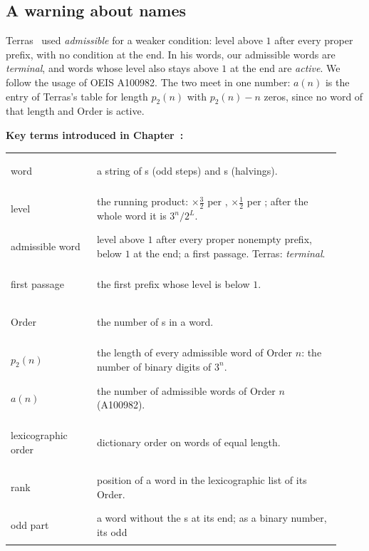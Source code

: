 \documentclass[11pt,a4paper,titlepage]{article}
\makeatletter
\newcommand{\boxhere}[1]{\leavevmode
  \Hy@raisedlink{\hyper@anchorstart{box:#1}\hyper@anchorend}}
\newcommand{\termlink}[2]{\hyperlink{term:#1}{#2}}
\newif\ifpaper
\newenvironment{wordbox}
  {\par\ifpaper\vspace*{\fill}\vspace{\bigskipamount}\else\medskip\fi
   \noindent\begin{lrbox}{\wordboxbin}%
   \begin{minipage}{\dimexpr\linewidth-2\fboxsep-2\fboxrule\relax}\small
   \textbf{Key terms introduced in Chapter~\thesection:}\par\smallskip
   \begin{tabular}{@{}>{\bfseries\boldmath\raggedright\arraybackslash}p{0.24\linewidth}p{0.68\linewidth}@{}}}
  {\end{tabular}\end{minipage}\end{lrbox}%
   \fcolorbox{black!40}{black!3}{\usebox{\wordboxbin}}\par\ifpaper\else\medskip\fi}
\makeatother
\begin{document}
\subsection*{A warning about names}

Terras~\cite{Terras1976} used \emph{admissible} for a weaker condition: level
above $1$ after every proper prefix, with no condition at the end. In his words,
our admissible words are \emph{terminal}, and words whose level also stays
above $1$ at the end are \emph{active}. We follow the usage of OEIS A100982.
The two meet in one number: $a(n)$ is the entry of Terras's table for length
$p_2(n)$ with $p_2(n) - n$ zeros, since no word of that length and Order is
active.

\begin{wordbox}
\boxhere{word}word\index{word@\termlink{word}{word}|textbf} & a string of \bw{1}s (odd steps) and \bw{0}s (halvings). \\
\boxhere{level}level\index{level@\termlink{level}{level}|textbf} & the running product: $\times\frac32$ per \bw{1}, $\times\frac12$ per \bw{0};
  after the whole word it is $3^n/2^L$. \\
\boxhere{admissible}admissible word\index{admissible word@\termlink{admissible}{admissible word}|textbf} & level above $1$ after every proper nonempty prefix, below
  $1$ at the end; a first passage. Terras: \emph{terminal}. \\
\boxhere{firstpassage}first passage\index{first passage@\termlink{firstpassage}{first passage}|textbf} & the first prefix whose level is below $1$. \\
\boxhere{order}Order\index{order@\termlink{order}{Order}|textbf} & the number of \bw{1}s in a word. \\
\boxhere{p2n}$p_2(n)$\index{p2(n)@\termlink{p2n}{$p_2(n)$}|textbf} & the length of every admissible word of Order $n$: the number of
  binary digits of $3^n$. \\
\boxhere{an}$a(n)$\index{a(n)@\termlink{an}{$a(n)$}|textbf} & the number of admissible words of Order $n$ (A100982). \\
\boxhere{lex}lexicographic order\index{lexicographic order@\termlink{lex}{lexicographic order}|textbf} & dictionary order on words of equal length. \\
\boxhere{rank}rank\index{rank@\termlink{rank}{rank}|textbf} & position of a word in the lexicographic list of its Order. \\
\boxhere{oddpart}odd part\index{odd part@\termlink{oddpart}{odd part}|textbf} & a word without the \bw{0}s at its end; as a binary number, its odd

\end{wordbox}
\end{document}
